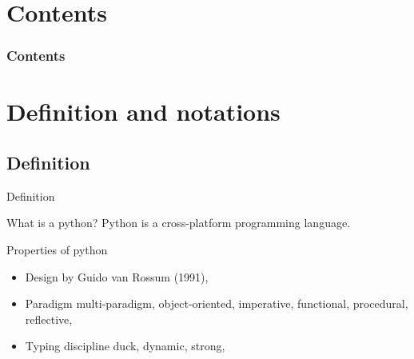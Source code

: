 \documentclass[english,10pt,table]{beamer}
\begin{document}
\begin{frame}
  \maketitle
\end{frame}

\section*{Contents}
\begin{frame}\frametitle<presentation>{Contents}
  \tableofcontents
\end{frame}


\section{Definition and notations}
\subsection{Definition}
\begin{frame}{Definition}		
	\begin{block}{What is a python?}
	Python is a cross-platform programming language.
  \end{block}	
\pause
		
	\begin{block}{Properties of python}
	 \begin{itemize}
		 \item \alert{Design by} Guido van Rossum (1991),
		 \item \alert{Paradigm} multi-paradigm, object-oriented, imperative, functional, procedural, reflective,
		 \item \alert{Typing discipline} duck, dynamic, strong,
   \end{itemize}
  \end{block}	
\end{frame}

\end{document}
